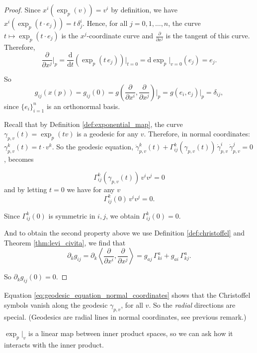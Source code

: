 \begin{proof}
Since $x^i(\exp_p(v)) = v^i$ by definition, we have $x^i(\exp_p(t \cdot e_j)) = t \, \delta_j^i$. Hence, for all $j = 0, 1, \ldots, n$, the curve $t \mapsto \exp_p(t \cdot e_j)$ is the $x^j$-coordinate curve and $\frac{\partial}{\partial x^j}$ is the tangent of this curve. Therefore,
\[
\frac{\partial}{\partial x^j}\bigg|_p = \frac{\mathrm{d}}{\mathrm{d} t}(\exp_p(t \, e_j))\bigg|_{t=0} = \mathrm{d} \exp_p\big|_{v=0}(e_j) = e_j.
\]

So
\[
g_{ij}(x(p)) =g_{ij}(0) = g\left(\frac{\partial}{\partial x^i}, \frac{\partial}{\partial x^j}\right)\bigg|_p = g(e_i, e_j)|_p  = \delta_{ij},
\]
since $\{e_i\}_{i=1}^n$ is an orthonormal basis.

Recall that by Definition \ref{def:exponential_map}, the curve $\gamma_{p,v}(t) = \exp_p(tv)$ is a geodesic for any $v$. Therefore, in normal coordinates: $\gamma_{p,v}^k(t) = t \cdot v^k$. So the geodesic equation, $\ddot{\gamma}_{p,v}^k(t) + \Gamma_{ij}^k(\gamma_{p,v}(t))\, \dot{\gamma}_{p,v}^i \, \dot{\gamma}_{p,v}^j = 0$, becomes

\begin{equation}
    \label{eq:geodesic_equation_normal_coordinates}
    \Gamma_{ij}^k(\gamma_{p,v}(t))\, v^i v^j = 0
\end{equation}
and by letting $t=0$ we have for any $v$
\[
\Gamma_{ij}^k(0)\, v^i v^j = 0.
\]

Since $\Gamma_{ij}^k(0)$ is symmetric in $i, j$, we obtain $\Gamma_{ij}^k(0) = 0$.

And to obtain the second property above we use Definition \ref{def:christoffel} and Theorem \ref{thm:levi_civita}, we find that
\[
\partial_k g_{ij} = \partial_k \left\langle \frac{\partial}{\partial x^i}, \frac{\partial}{\partial x^j} \right\rangle = g_{aj}\, \Gamma_{ki}^a + g_{ai}\, \Gamma_{kj}^a.
\]

So $\partial_k g_{ij}(0) = 0$.
\end{proof}

\begin{colremark}
Equation \eqref{eq:geodesic_equation_normal_coordinates} shows that the Christoffel symbols vanish along the geodesic $\gamma_{p,v}$, for all $v$. So the \emph{radial} directions are special. (Geodesics are radial lines in normal coordinates, see previous remark.)
\end{colremark}


$\exp_p\big|_v$ is a linear map between inner product spaces, so we can ask how it interacts with the inner product.


